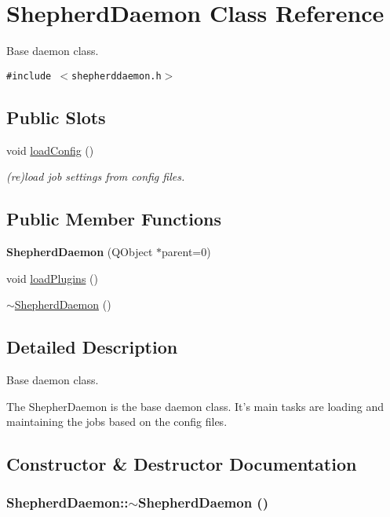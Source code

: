 \hypertarget{class_shepherd_daemon}{
\section{ShepherdDaemon Class Reference}
\label{class_shepherd_daemon}
}
Base daemon class.  


{\tt \#include $<$shepherddaemon.h$>$}

\subsection*{Public Slots}
\begin{CompactItemize}
\item 
void \hyperlink{class_shepherd_daemon_2738c4b68ae3038188c87d7c6512e62f}{loadConfig} ()
\begin{CompactList}\small\item\em (re)load job settings from config files. \item\end{CompactList}\end{CompactItemize}
\subsection*{Public Member Functions}
\begin{CompactItemize}
\item 
\hypertarget{class_shepherd_daemon_c96e5fdb94d7188fea8eb02671aa22ec}{
\textbf{ShepherdDaemon} (QObject $\ast$parent=0)}
\label{class_shepherd_daemon_c96e5fdb94d7188fea8eb02671aa22ec}

\item 
void \hyperlink{class_shepherd_daemon_39a63b10905db37058532a2571b001be}{loadPlugins} ()
\item 
\hyperlink{class_shepherd_daemon_da294049c1e4b13e4b6ab8e0e4d7acb3}{$\sim$ShepherdDaemon} ()
\end{CompactItemize}


\subsection{Detailed Description}
Base daemon class. 

The ShepherDaemon is the base daemon class. It's main tasks are loading and maintaining the jobs based on the config files. 

\subsection{Constructor \& Destructor Documentation}
\hypertarget{class_shepherd_daemon_da294049c1e4b13e4b6ab8e0e4d7acb3}{
\subsubsection[{$\sim$ShepherdDaemon}]{\setlength{\rightskip}{0pt plus 5cm}ShepherdDaemon::$\sim$ShepherdDaemon ()}}
\label{class_shepherd_daemon_da294049c1e4b13e4b6ab8e0e4d7acb3}


